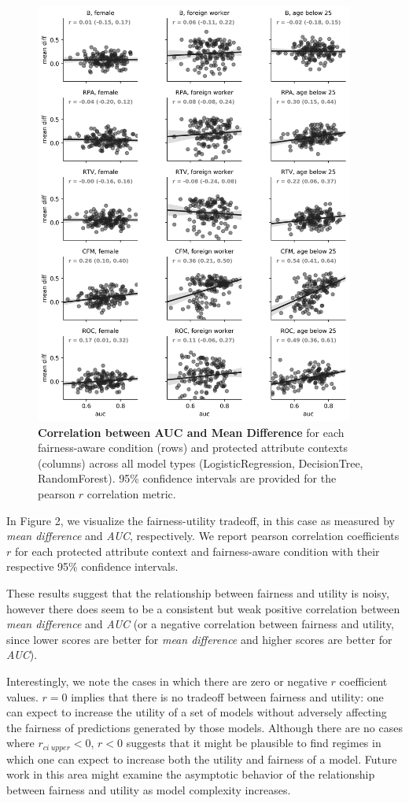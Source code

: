 \documentclass[man,natbib]{apa6}
\begin{document}
\begin{figure}[h]
\centering
\includegraphics[width=10.5cm]{fairness_utility_tradeoff.png}
\caption{
  \textbf{Correlation between AUC and Mean Difference} for each fairness-aware
  condition (rows) and protected attribute contexts (columns) across all model
  types (LogisticRegression, DecisionTree,   RandomForest). 95\% confidence
  intervals are provided for the pearson \(r\) correlation metric.}
\label{figure-2-fairness-utility-tradeoff}
\end{figure}

In Figure 2, we visualize the fairness-utility tradeoff, in this case as
measured by \emph{mean difference} and \emph{AUC}, respectively. We report
pearson correlation coefficients \(r\) for each protected attribute context and
fairness-aware condition with their respective 95\% confidence intervals.

These results suggest that the relationship between fairness and utility is
noisy, however there does seem to be a consistent but weak positive correlation
between \emph{mean difference} and \emph{AUC} (or a negative correlation between
fairness and utility, since lower scores are better for \emph{mean difference}
and higher scores are better for \emph{AUC}).

Interestingly, we note the cases in which there are zero or negative \(r\)
coefficient values. \(r = 0\) implies that there is no tradeoff between fairness
and utility: one can expect to increase the utility of a set of models without
adversely affecting the fairness of predictions generated by those models.
Although there are no cases where \(r_{ci\ upper} < 0\), \(r < 0\) suggests that
it might be plausible to find regimes in which one can expect to increase both
the utility and fairness of a model. Future work in this area might examine the
asymptotic behavior of the relationship between fairness and utility as model
complexity increases.
\end{document}
